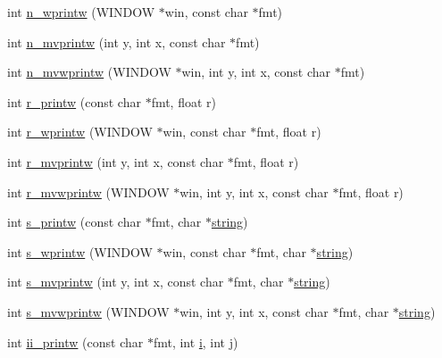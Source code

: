 \begin{DoxyCompactItemize}
\item 
int \hyperlink{C-macros_8c_aba52f28e4d247225cd79e21121b88655}{n\+\_\+wprintw} (W\+I\+N\+D\+OW $\ast$win, const char $\ast$fmt)
\item 
int \hyperlink{C-macros_8c_a46f0d46efcc85de74c517a5a30d5bf8c}{n\+\_\+mvprintw} (int y, int x, const char $\ast$fmt)
\item 
int \hyperlink{C-macros_8c_a84bbf8649db5247fc4d8f2d7fe3d22a0}{n\+\_\+mvwprintw} (W\+I\+N\+D\+OW $\ast$win, int y, int x, const char $\ast$fmt)
\item 
int \hyperlink{C-macros_8c_af5706198a4ac8d519c30824899cd04eb}{r\+\_\+printw} (const char $\ast$fmt, float r)
\item 
int \hyperlink{C-macros_8c_a6eb29a28c7477bd1f35254a66f43a4c7}{r\+\_\+wprintw} (W\+I\+N\+D\+OW $\ast$win, const char $\ast$fmt, float r)
\item 
int \hyperlink{C-macros_8c_ad0708b8c6acaba96f40a85f691012abf}{r\+\_\+mvprintw} (int y, int x, const char $\ast$fmt, float r)
\item 
int \hyperlink{C-macros_8c_aee7cd6844203dd1d2b386c1a42fb97bb}{r\+\_\+mvwprintw} (W\+I\+N\+D\+OW $\ast$win, int y, int x, const char $\ast$fmt, float r)
\item 
int \hyperlink{C-macros_8c_a952575ee46d2e04849c57062c2cb769e}{s\+\_\+printw} (const char $\ast$fmt, char $\ast$\hyperlink{what__overview_81_8txt_a74cb7e955273b9f9157b4f0c18a38849}{string})
\item 
int \hyperlink{C-macros_8c_a90e6df6fa68a7a58b21a763fc85a21ff}{s\+\_\+wprintw} (W\+I\+N\+D\+OW $\ast$win, const char $\ast$fmt, char $\ast$\hyperlink{what__overview_81_8txt_a74cb7e955273b9f9157b4f0c18a38849}{string})
\item 
int \hyperlink{C-macros_8c_a9b49cfc267a4953f8983e6e50aa43aaa}{s\+\_\+mvprintw} (int y, int x, const char $\ast$fmt, char $\ast$\hyperlink{what__overview_81_8txt_a74cb7e955273b9f9157b4f0c18a38849}{string})
\item 
int \hyperlink{C-macros_8c_a34a56ec22fc3813b4971c20eb6d699ff}{s\+\_\+mvwprintw} (W\+I\+N\+D\+OW $\ast$win, int y, int x, const char $\ast$fmt, char $\ast$\hyperlink{what__overview_81_8txt_a74cb7e955273b9f9157b4f0c18a38849}{string})
\item 
int \hyperlink{C-macros_8c_a485ef33f3e0fb3900f69d4b869b619f1}{ii\+\_\+printw} (const char $\ast$fmt, int \hyperlink{intro__blas1_83_8txt_a8ba82a50c0c2c12d5f6a77f7e4651c0b}{i}, int \hyperlink{exit_87_8txt_a8921ef29c441e427867c54bd3b2462ba}{j})
\item 

\end{DoxyCompactItemize}
